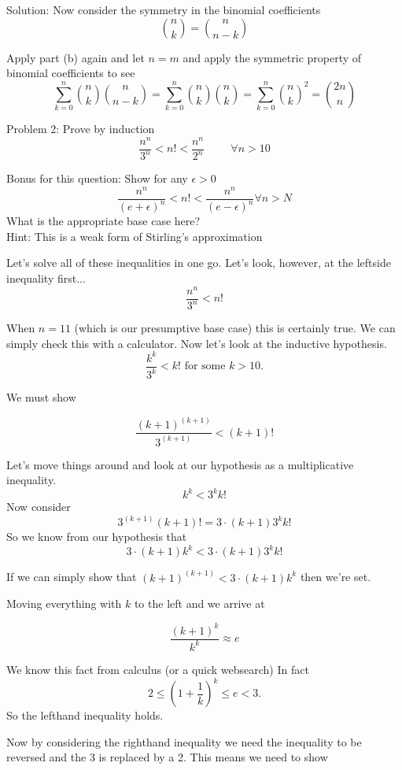 \documentclass[16 pt]{amsart}
\theoremstyle{definition}
\theoremstyle{remark}
\numberwithin{equation}{subsection}
\begin{document}
\vspace{.5in}

Solution:  Now consider the symmetry in the binomial coefficients
\[
{n \choose k} = {n \choose n-k}
\]

Apply part (b) again and let $n=m$ and apply the symmetric property of binomial coefficients to see
\[
\sum_{k=0}^{n}{n \choose k}{n \choose n-k} = \sum_{k=0}^{n}{n \choose k}{n \choose k} = \sum_{k=0}^{n}{n \choose k}^2 = {2n \choose n}
\]

\newpage


Problem 2: Prove by induction
\[
\frac{n^n}{3^n} < n! < \frac{n^n}{2^n} \hspace{1cm} \forall n > 10
\]

\vspace{.25in}
Bonus for this question: Show for any $\epsilon >0$
\[
\frac{n^n}{(e+\epsilon)^n} < n! < \frac{n^n}{(e-\epsilon)^n} \forall n>N
\]
What is the appropriate base case here?\\
Hint: This is a weak form of Stirling's approximation

\vspace{.5in}

Let's solve all of these inequalities in one go.  Let's look, however, at the leftside inequality first...
\[
\frac{n^n}{3^n} < n! 
\]

When $n=11$ (which is our presumptive base case) this is certainly true.  We can simply check this with a calculator.  Now let's look at the inductive hypothesis.
\[
\frac{k^k}{3^k} < k! \text{ for some } k>10.
\]

We must show 

\[
\frac{(k+1)^{(k+1)}}{3^{(k+1)}} < (k+1)!
\]

Let's move things around and look at our hypothesis as a multiplicative inequality.
\[
k^k < 3^k k!
\]
Now consider
\[
3^{(k+1)}(k+1)! = 3\cdot(k+1) 3^k k!
\]
So we know from our hypothesis that
\[
3\cdot(k+1) k^k < 3\cdot (k+1) 3^k k!
\]

If we can simply show that $(k+1)^{(k+1)} < 3\cdot (k+1) k^k$ then we're set.  

Moving everything with $k$ to the left and we arrive at

\[
\frac{(k+1)^k}{k^k} \approx e
\]

We know this fact from calculus (or a quick websearch)
In fact
\[
2 \le \left(1 + \frac{1}{k}\right)^k \le e < 3.
\]
So the lefthand inequality holds.

Now by considering the righthand inequality we need the inequality to be reversed and the 3 is replaced by a 2.
This means we need to show
\end{document}
